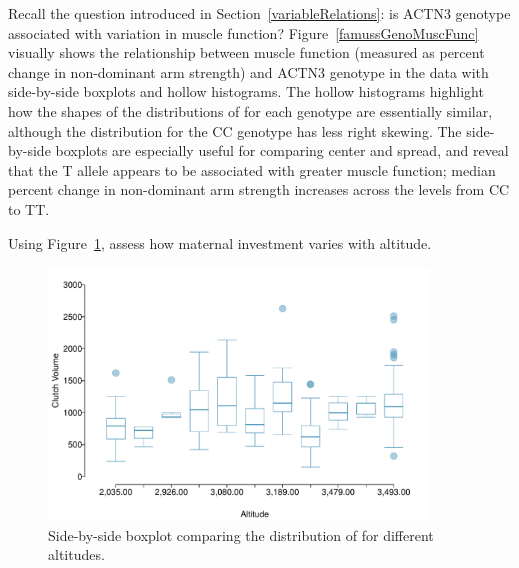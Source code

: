 Recall the question introduced in Section~\ref{variableRelations}: is ACTN3 genotype associated with variation in muscle function? Figure~\ref{famussGenoMuscFunc} visually shows the relationship between muscle function (measured as percent change in non-dominant arm strength) and ACTN3 genotype in the  data with side-by-side boxplots and hollow histograms. The hollow histograms highlight how the shapes of the distributions of  for each genotype are essentially similar, although the distribution for the CC genotype has less right skewing. The side-by-side boxplots are especially useful for comparing center and spread, and reveal that the T allele appears to be associated with greater muscle function; median percent change in non-dominant arm strength increases across the levels from CC to TT. 



\begin{exercisewrap}
\begin{nexercise}
Using Figure~\ref{frogClutchVolAlt}, assess how maternal investment varies with altitude.\footnotemark{}
\end{nexercise}
\end{exercisewrap}
	
\begin{figure}[h]
	\centering
	\includegraphics[width=0.9\textwidth]{ch_intro_to_data_oi_biostat/figures/frogClutchVolAlt/frogClutchVolAlt}
	\caption{Side-by-side boxplot comparing the distribution of  for different altitudes.}
	\label{frogClutchVolAlt}
\end{figure} 

